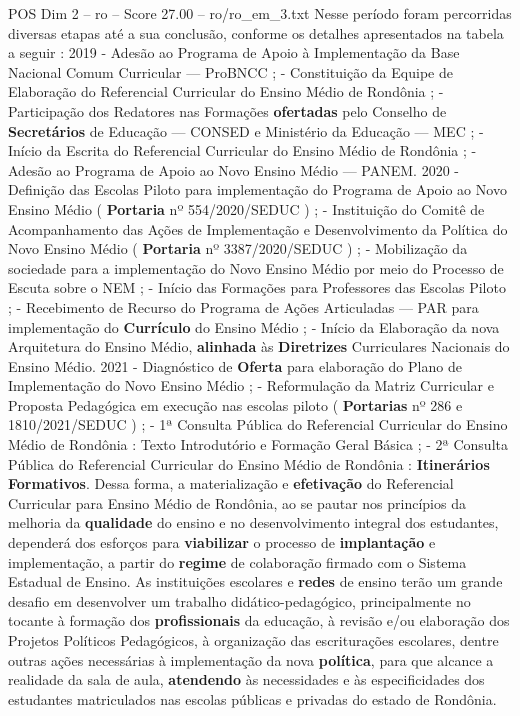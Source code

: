 \begin{textsample}{POS Dim 2 – ro – Score 27.00 – ro/ro\_em\_3.txt}
Nesse período foram percorridas diversas etapas até a sua conclusão, conforme os detalhes apresentados na tabela a seguir : 2019 - Adesão ao Programa de Apoio à Implementação da Base Nacional Comum Curricular — ProBNCC ; - Constituição da Equipe de Elaboração do Referencial Curricular do Ensino Médio de Rondônia ; - Participação dos Redatores nas Formações \textbf{ofertadas} pelo Conselho de \textbf{Secretários} de Educação — CONSED e Ministério da Educação — MEC ; - Início da Escrita do Referencial Curricular do Ensino Médio de Rondônia ; - Adesão ao Programa de Apoio ao Novo Ensino Médio — PANEM. 2020 - Definição das Escolas Piloto para implementação do Programa de Apoio ao Novo Ensino Médio ( \textbf{Portaria} nº 554/2020/SEDUC ) ; - Instituição do Comitê de Acompanhamento das Ações de Implementação e Desenvolvimento da Política do Novo Ensino Médio ( \textbf{Portaria} nº 3387/2020/SEDUC ) ; - Mobilização da sociedade para a implementação do Novo Ensino Médio por meio do Processo de Escuta sobre o NEM ; - Início das Formações para Professores das Escolas Piloto ; - Recebimento de Recurso do Programa de Ações Articuladas — PAR para implementação do \textbf{Currículo} do Ensino Médio ; - Início da Elaboração da nova Arquitetura do Ensino Médio, \textbf{alinhada} às \textbf{Diretrizes} Curriculares Nacionais do Ensino Médio. 2021 - Diagnóstico de \textbf{Oferta} para elaboração do Plano de Implementação do Novo Ensino Médio ; - Reformulação da Matriz Curricular e Proposta Pedagógica em execução nas escolas piloto ( \textbf{Portarias} nº 286 e 1810/2021/SEDUC ) ; - 1ª Consulta Pública do Referencial Curricular do Ensino Médio de Rondônia : Texto Introdutório e Formação Geral Básica ; - 2ª Consulta Pública do Referencial Curricular do Ensino Médio de Rondônia : \textbf{Itinerários} \textbf{Formativos}.
Dessa forma, a materialização e \textbf{efetivação} do Referencial Curricular para Ensino Médio de Rondônia, ao se pautar nos princípios da melhoria da \textbf{qualidade} do ensino e no desenvolvimento integral dos estudantes, dependerá dos esforços para \textbf{viabilizar} o processo de \textbf{implantação} e implementação, a partir do \textbf{regime} de colaboração firmado com o Sistema Estadual de Ensino.
As instituições escolares e \textbf{redes} de ensino terão um grande desafio em desenvolver um trabalho didático-pedagógico, principalmente no tocante à formação dos \textbf{profissionais} da educação, à revisão e/ou elaboração dos Projetos Políticos Pedagógicos, à organização das escriturações escolares, dentre outras ações necessárias à implementação da nova \textbf{política}, para que alcance a realidade da sala de aula, \textbf{atendendo} às necessidades e às especificidades dos estudantes matriculados nas escolas públicas e privadas do estado de Rondônia.

\end{textsample}
